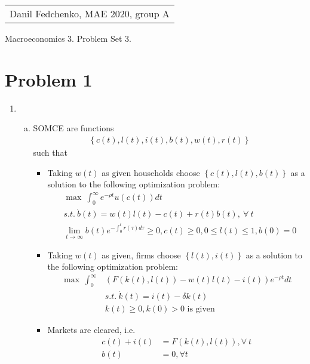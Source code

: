 \documentclass[a4paper]{article}
\begin{document}
	\begin{flushright}
	\begin{tabular}{r}
		Danil Fedchenko, MAE 2020, group A \\
	\end{tabular}
\end{flushright}


\begin{center}
	Macroeconomics 3. Problem Set 3.
\end{center}
\section*{Problem 1}
\begin{enumerate}[1.]
	\item \begin{enumerate}[(a)]
		\item SOMCE are functions
		\begin{align*}
		\left\{c(t), l(t), i(t), b(t), w(t), r(t)\right\}
		\end{align*}
		such that
		\begin{itemize}
			\item Taking $w(t)$ as given households choose $\left\{c(t), l(t), b(t)\right\}$ as a solution to the following optimization problem:
			\begin{align*}
			&\max\ \int_{0}^{\infty} e^{-\rho t}u(c(t))dt\\
			&s.t.\ \dot{b}(t) = w(t)l(t) -c(t) + r(t)b(t),\ \forall\ t\\
			&\lim_{t \to \infty} b(t)e^{-\int_{0}^t r(\tau)d\tau} \ge 0, c(t) \ge 0, 0 \le l(t) \le 1, b(0) = 0
			\end{align*}
			\item Taking $w(t)$ as given, firms choose $\left\{l(t), i(t)\right\}$ as a solution to the following optimization problem:
			\begin{align*}
			\max\ \int_{0}^{\infty} &(F(k(t), l(t)) - w(t)l(t) - i(t))e^{-\rho t}dt\\
			&s.t.\ \dot{k}(t) = i(t) - \delta k(t)\\
			&k(t) \ge 0, k(0) > 0 \text{ is given}
			\end{align*}
			\item Markets are cleared, i.e.
			\begin{align*}
			c(t) + i(t) &= F(k(t), l(t)), \forall\ t\\
			b(t) &= 0, \forall t
			\end{align*}
		\end{itemize}

\end{enumerate}
\end{enumerate}
\end{document}
